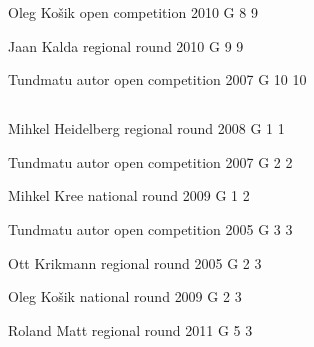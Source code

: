 \documentclass[11pt]{article}
\begin{document}
\ylDisplay{} %
{Oleg Košik} %
{open competition} %
{2010} %
{G 8} %
{9} %
{

\ifEngStatement
\fi
}

\ylDisplay{} %
{Jaan Kalda} %
{regional round} %
{2010} %
{G 9} %
{9} %
{

\ifEngStatement
\fi
}

\ylDisplay{} %
{Tundmatu autor} %
{open competition} %
{2007} %
{G 10} %
{10} %
{

\ifEngStatement
\fi
}
\newpage\subsection{\protect{}}

\ylDisplay{} %
{Mihkel Heidelberg} %
{regional round} %
{2008} %
{G 1} %
{1} %
{

\ifEngStatement
\fi
}

\ylDisplay{} %
{Tundmatu autor} %
{open competition} %
{2007} %
{G 2} %
{2} %
{

\ifEngStatement
\fi
}

\ylDisplay{} %
{Mihkel Kree} %
{national round} %
{2009} %
{G 1} %
{2} %
{

\ifEngStatement
\fi
}

\ylDisplay{} %
{Tundmatu autor} %
{open competition} %
{2005} %
{G 3} %
{3} %
{

\ifEngStatement
\fi
}

\ylDisplay{} %
{Ott Krikmann} %
{regional round} %
{2005} %
{G 2} %
{3} %
{

\ifEngStatement
\fi
}

\ylDisplay{} %
{Oleg Košik} %
{national round} %
{2009} %
{G 2} %
{3} %
{

\ifEngStatement
\fi
}

\ylDisplay{} %
{Roland Matt} %
{regional round} %
{2011} %
{G 5} %
{3} %
{

\ifEngStatement
\fi
}
\end{document}

